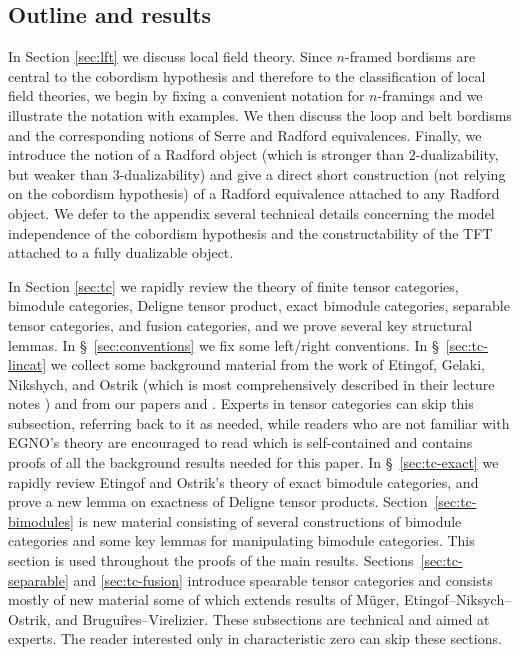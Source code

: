 \documentclass{amsart}
\begin{document}
\subsection*{Outline and results}

In Section \ref{sec:lft} we discuss local field theory.  Since $n$-framed bordisms are central to the cobordism hypothesis and therefore to the classification of local field theories, we begin by fixing a convenient notation for $n$-framings and we illustrate the notation with examples.  We then discuss the loop and belt bordisms and the corresponding notions of Serre and Radford equivalences.  Finally, we introduce the notion of a Radford object (which is stronger than $2$-dualizability, but weaker than $3$-dualizability) and give a direct short construction (not relying on the cobordism hypothesis) of a Radford equivalence attached to any Radford object.  We defer to the appendix several technical details concerning the model independence of the cobordism hypothesis and the constructability of the TFT attached to a fully dualizable object.

In Section \ref{sec:tc} we rapidly review the theory of finite tensor categories, bimodule categories, Deligne tensor product, exact bimodule categories, separable tensor categories, and fusion categories, and we prove several key structural lemmas.   In \S~\ref{sec:conventions} we fix some left/right conventions.  In \S~\ref{sec:tc-lincat} we collect some background material from the work of Etingof, Gelaki, Nikshych, and Ostrik (which is most comprehensively described in their lecture notes \cite{EGNO}) and from our papers \cite{BTP} and \cite{3TC}.  Experts in tensor categories can skip this subsection, referring back to it as needed, while readers who are not familiar with EGNO's theory are encouraged to read \cite{BTP} which is self-contained and contains proofs of all the background results needed for this paper.  In \S~\ref{sec:tc-exact} we rapidly review Etingof and Ostrik's theory of exact bimodule categories, and prove a new lemma on exactness of Deligne tensor products.  Section~\ref{sec:tc-bimodules} is new material consisting of several constructions of bimodule categories and some key lemmas for manipulating bimodule categories.  This section is used throughout the proofs of the main results.  Sections~\ref{sec:tc-separable} and \ref{sec:tc-fusion} introduce spearable tensor categories and consists mostly of new material some of which extends results of M\"uger, Etingof--Niksych--Ostrik, and Brugui\`res--Virelizier.  These subsections are technical and aimed at experts.  The reader interested only in characteristic zero can skip these sections.
\end{document}
